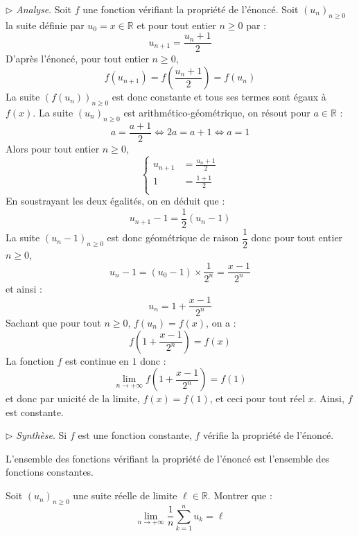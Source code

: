 \documentclass[a4paper,10pt]{report}
\begin{document}
\noindent $\rhd$ \textit{Analyse}. Soit $f$ une fonction vérifiant la propriété de l'énoncé. Soit $(u_n)_{n \geq 0}$ la suite définie par $u_0=x \in \mathbb{R}$ et pour tout entier $n \geq 0$ par :
$$ u_{n+1} = \dfrac{u_n+1}{2}$$
D'après l'énoncé, pour tout entier $n \geq 0$,
$$ f(u_{n+1}) = f \left( \frac{u_n+1}{2} \right) = f(u_n)$$
La suite $(f(u_n))_{n \geq 0}$ est donc constante et tous ses termes sont égaux à $f(x)$. La suite $(u_n)_{n \geq 0}$ est arithmético-géométrique, on résout pour $a \in \mathbb{R}$ : 
$$ a = \dfrac{a+1}{2} \Longleftrightarrow 2a=a+1 \Longleftrightarrow a=1$$
Alors pour tout entier $n \geq 0$,
$$ \left\lbrace \begin{array}{cl}
u_{n+1} & =  \frac{u_n+1}{2}  \\[0.1cm]
1 & =  \frac{1+1}{2}  \\
\end{array}\right.$$
En soustrayant les deux égalités, on en déduit que :
$$u_{n+1}-1 = \dfrac{1}{2} (u_n-1)$$
La suite $(u_n-1)_{n \geq 0}$ est donc géométrique de raison $\dfrac{1}{2}$ donc pour tout entier $n \geq 0$,
$$ u_n - 1 = (u_0-1) \times \dfrac{1}{2^n} = \dfrac{x-1}{2^n}$$
et ainsi :
$$ u_n = 1 +  \dfrac{x-1}{2^n}$$
Sachant que pour tout $n \geq 0$, $f(u_n)=f(x)$, on a :
$$ f \left( 1 +  \dfrac{x-1}{2^n} \right) = f(x)$$
La fonction $f$ est continue en $1$ donc :
$$ \lim_{n \rightarrow + \infty}f \left( 1 +  \dfrac{x-1}{2^n} \right) = f(1)$$
et donc par unicité de la limite, $f(x)=f(1)$, et ceci pour tout réel $x$. Ainsi, $f$ est constante.

\medskip

\noindent $\rhd$ \textit{Synthèse}. Si $f$ est une fonction constante, $f$ vérifie la propriété de l'énoncé.

\medskip

\noindent L'ensemble des fonctions vérifiant la propriété de l'énoncé est l'ensemble des fonctions constantes.

\medskip


\begin{Exa} Soit $(u_n)_{n \geq 0}$ une suite réelle de limite $\ell \in \mathbb{R}$. Montrer que :
$$ \lim_{n \rightarrow + \infty} \frac{1}{n} \sum_{k=1}^n u_k = \ell$$
\end{Exa}
\end{document}
